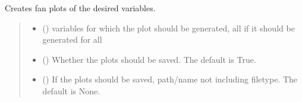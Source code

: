 \documentclass[letterpaper,10pt,english]{sphinxmanual}
\begin{document}
\begin{fulllineitems}
\begin{fulllineitems}
\begin{quote}
\begin{description}
\end{description}\end{quote}

\end{fulllineitems}


\begin{fulllineitems}
\label{\detokenize{MUFBVAR:MUFBVAR.mufbvar.multifrequency_var.fanchart}}
\pysigstartsignatures
{}
\pysigstopsignatures
\sphinxAtStartPar
Creates fan plots of the desired variables.
\begin{quote}\begin{description}
\begin{itemize}
\item {} 
\sphinxAtStartPar
{} () \textendash{} variables for which the plot should be generated, all if it should be generated for all

\item {} 
\sphinxAtStartPar
{} () \textendash{} Whether the plots should be saved. The default is True.

\item {} 
\sphinxAtStartPar
{} (\sphinxstyleliteralemphasis{\sphinxupquote{, }}) \textendash{} If the plots should be saved, path/name not including filetype. The default is None.


\end{itemize}
\end{description}
\end{quote}
\end{fulllineitems}
\end{fulllineitems}
\end{document}
